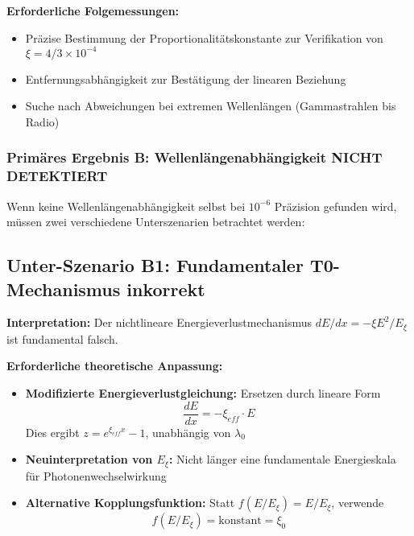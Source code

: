 \documentclass[12pt,a4paper]{article}
\theoremstyle{definition}
\begin{document}
	\textbf{Erforderliche Folgemessungen:}
	\begin{itemize}
		\item Pr\"azise Bestimmung der Proportionalit\"atskonstante zur Verifikation von $\xi = 4/3 \times 10^{-4}$
		\item Entfernungsabh\"angigkeit zur Best\"atigung der linearen Beziehung
		\item Suche nach Abweichungen bei extremen Wellenl\"angen (Gammastrahlen bis Radio)
	\end{itemize}
	
	\subsubsection{Prim\"ares Ergebnis B: Wellenl\"angenabh\"angigkeit NICHT DETEKTIERT}
	\label{subsubsec:not_detected}
	
	Wenn keine Wellenl\"angenabh\"angigkeit selbst bei $10^{-6}$ Pr\"azision gefunden wird, m\"ussen zwei verschiedene Unterszenarien betrachtet werden:
	
	\subsection{Unter-Szenario B1: Fundamentaler T0-Mechanismus inkorrekt}
	\label{subsec:scenario_b1}
	
	\textbf{Interpretation:} Der nichtlineare Energieverlustmechanismus $dE/dx = -\xi E^2/E_\xi$ ist fundamental falsch.
	
	\textbf{Erforderliche theoretische Anpassung:}
	\begin{itemize}
		\item \textbf{Modifizierte Energieverlustgleichung:} Ersetzen durch lineare Form
		\begin{equation}
			\frac{dE}{dx} = -\xi_{eff} \cdot E
		\end{equation}
		Dies ergibt $z = e^{\xi_{eff} x} - 1$, unabh\"angig von $\lambda_0$
		
		\item \textbf{Neuinterpretation von $E_\xi$:} Nicht l\"anger eine fundamentale Energieskala f\"ur Photonenwechselwirkung
		
		\item \textbf{Alternative Kopplungsfunktion:} Statt $f(E/E_\xi) = E/E_\xi$, verwende
		\begin{equation}
			f(E/E_\xi) = \text{konstant} = \xi_0
		\end{equation}
	\end{itemize}
	
\end{document}
